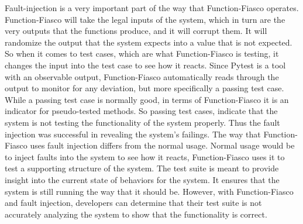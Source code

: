   Fault-injection is a very important part of the way that Function-Fiasco operates. Function-Fiasco will take the legal inputs of the system, which in turn are the very outputs that the functions produce, and it will corrupt them. It will randomize the output that the system expects into a value that is not expected. So when it comes to test cases, which are what Function-Fiasco is testing, it changes the input into the test case to see how it reacts. Since Pytest is a tool with an observable output, Function-Fiasco automatically reads through the output to monitor for any deviation, but more specifically a passing test case. While a passing test case is normally good, in terms of Function-Fiasco it is an indicator for pseudo-tested methods. So passing test cases, indicate that the system is not testing the functionality of the system properly. Thus the fault injection was successful in revealing the system's failings. The way that Function-Fiasco uses fault injection differs from the normal usage. Normal usage would be to inject faults into the system to see how it reacts, Function-Fiasco uses it to test a supporting structure of the system. The test suite is meant to provide insight into the current state of behaviors for the system. It ensures that the system is still running the way that it should be. However, with Function-Fiasco and fault injection, developers can determine that their test suite is not accurately analyzing the system to show that the functionality is correct.


